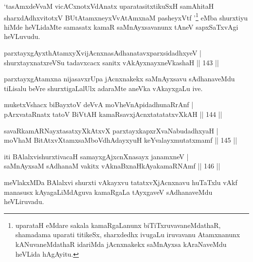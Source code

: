 \begin{artha}
`tasAmxdeVvaM vicACxnotxVdAnatx uparatasitxtikuSxH samAhitaH sharxdAdhxvitotxV BUtA\s\s tamxneyxVvA\s tAmxnaM pasheyxVtf '\footnote{uparataH eMdare sakala kamaRgaLanunx biTiTxruvavaneMdathaR, shamadama uparati titikeSx, sharxdedhx ivugaLu iruvavanu Atamxnanunx kANuvaneMdathaR idariMda jAcnxnakekx saMnAyxsa kAraNaveMdu heVLida hAgAyitu.} eMba shurxtiyu hiMde heVLidaMte samasatx kamaR saMnAyxsavanunx tAneV sapxSaTxvAgi heVLuvudu.
\end{artha}

\begin{shl}
parxtayxgAyxthAtamxyXvijAcnxnasAdhanatavxparxsidadhxyeV |\\
shurxtayxnatxreVSu tadavxcacx sanitx vAkAyxnayxneVkashaH \hfill || 143 ||
\end{shl}	

\begin{artha}
parxtayxgAtamxna nijasavxrUpa jAcnxnakekx saMnAyxsavu sAdhanaveMdu tiLisalu beVre shurxtigaLalUlx adaraMte aneVka vAkayxgaLu ive. 
\end{artha}


\begin{shl}
muketxVshacx biBayxtoV deVvA moVheVnApidadhunaRrAnf |\\
pArxvataRnatx tatoV BiVtAH kamaRsavxjAcnxtatatatxvXkAH \hfill || 144 ||
\end{shl}

\begin{shl}
savaRkamARNayxtasatxyXkAtxvX parxtayxkapxrXvaNabudadhxyaH |\\
moVhaM BitAtxvX\s \s tamxsaMboVdhAdayxyuH keYvalayxmutatxmamf \hfill || 145 ||
\end{shl}

\begin{shl}
iti BAlalxvishurxtivacaH samayxgAjxcnXnasayx janamxneV |\\
saMnAyxsaM sAdhanaM vakitx vAknaBxnaHkAyakamaRNAmf \hfill || 146 ||
\end{shl}

\begin{artha}%
meVlakxMDa BAlalxvi shurxti vAkayxvu tatatxvXjAcnxnavu huTaTxlu vAkf manasusx kAyagaLiMdAguva kamaRgaLa tAyxgaveV sAdhanaveMdu heVLiruvadu.
\end{artha}



